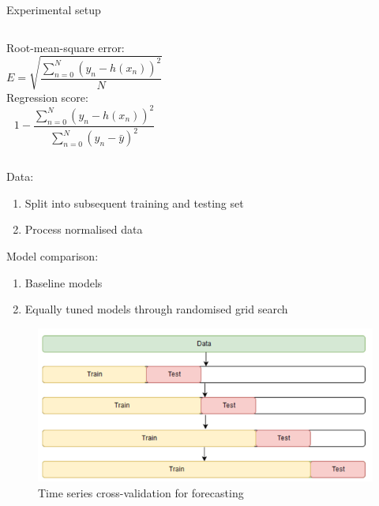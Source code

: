 \documentclass[9.5pt]{beamer}
\begin{document}
    \begin{frame}{Experimental setup}
        \begin{columns}[onlytextwidth]
            \centering
            Root-mean-square error:
            \[E = \sqrt{\dfrac{\sum_{n=0}^N (y_n - h(x_n))^2}{N}}\]
            \centering
            Regression score:
            \[1-\dfrac{\sum_{n=0}^N (y_n - h(x_n))^2}{\sum_{n=0}^N (y_n - \bar{y})^2}\]
        \end{columns}

        Data:
        \begin{enumerate}
            \item Split into subsequent training and testing set
            \item Process normalised data
        \end{enumerate}

        Model comparison:
        \begin{enumerate}
            \item Baseline models
            \item Equally tuned models through randomised grid search
        \end{enumerate}

    \end{frame}

    \begin{frame}{}
        \bigskip
        \begin{figure}
            \centering
            \includegraphics[width=\linewidth]{images/validation}
            \caption{Time series cross-validation for forecasting}
        \end{figure}
    \end{frame}
\end{document}
